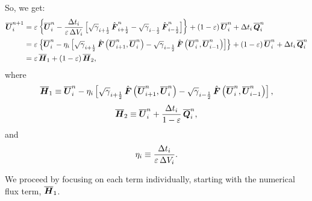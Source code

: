 \documentclass[10pt,preprint]{aastex}
\begin{document}
So, we get:
\begin{align}
    \ol{\bU}^{n+1}_{i}&=\ve\left\{\ol{\bU}^{n}_{i}-\f{\Delta t_{i}}{\ve\,\Delta V_{i}}\left[\sqrtgm_{\iph}\,\hat{\bF}^{n}_{\iph}-\sqrtgm_{\imh}\,\hat{\bF}^{n}_{\imh}\right]\right\}+\left(1-\ve\right)\ol{\bU}^{n}_{i}+\Delta t_{i}\,\ol{\bQ}^{n}_{i}\\
    &=\ve\left\{\ol{\bU}^{n}_{i}-\eta_{i}\left[\sqrtgm_{\iph}\,\hat{\bF}\left(\ol{\bU}^{n}_{i+1},\ol{\bU}^{n}_{i}\right)-\sqrtgm_{\imh}\,\hat{\bF}\left(\ol{\bU}^{n}_{i},\ol{\bU}^{n}_{i-1}\right)\right]\right\}+\left(1-\ve\right)\ol{\bU}^{n}_{i}+\Delta t_{i}\,\ol{\bQ}^{n}_{i}\\
    &=\ve\,\ol{\bH}_{1}+\left(1-\ve\right)\ol{\bH}_{2},
\end{align}
where
\begin{equation}
    \ol{\bH}_{1}\equiv \ol{\bU}^{n}_{i}-\eta_{i}\left[\sqrtgm_{\iph}\,\hat{\bF}\left(\ol{\bU}^{n}_{i+1},\ol{\bU}^{n}_{i}\right)-\sqrtgm_{\imh}\,\hat{\bF}\left(\ol{\bU}^{n}_{i},\ol{\bU}^{n}_{i-1}\right)\right],
\end{equation}
\begin{equation}
    \ol{\bH}_{2}\equiv\ol{\bU}^{n}_{i}+\f{\Delta t_{i}}{1-\ve}\,\ol{\bQ}^{n}_{i},
\end{equation}
and
\begin{equation}
    \eta_{i}\equiv\f{\Delta t_{i}}{\ve\,\Delta V_{i}}.
\end{equation}

We proceed by focusing on each term individually, starting with the numerical flux term, $\ol{\bH}_{1}$.
\end{document}
